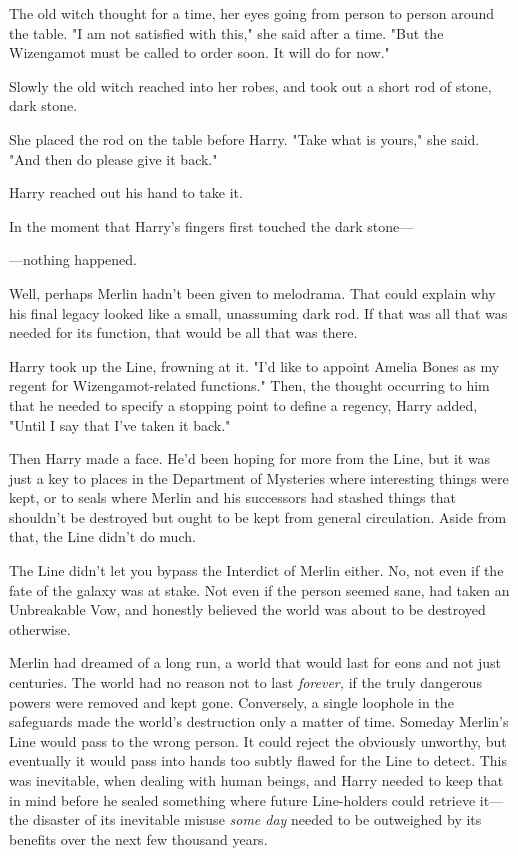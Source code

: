 The old witch thought for a time, her eyes going from person to person around
the table. "I am not satisfied with this," she said after a time. "But the
Wizengamot must be called to order soon. It will do for now."

Slowly the old witch reached into her robes, and took out a short rod of stone,
dark stone.

She placed the rod on the table before Harry. "Take what is yours," she said.
"And then do please give it back."

Harry reached out his hand to take it.

In the moment that Harry's fingers first touched the dark stone---

---nothing happened.

Well, perhaps Merlin hadn't been given to melodrama. That could explain why his
final legacy looked like a small, unassuming dark rod. If that was all that was
needed for its function, that would be all that was there.

Harry took up the Line, frowning at it. "I'd like to appoint Amelia Bones as my
regent for Wizengamot-related functions." Then, the thought occurring to him
that he needed to specify a stopping point to define a regency, Harry added,
"Until I say that I've taken it back."

Then Harry made a face. He'd been hoping for more from the Line, but it was
just a key to places in the Department of Mysteries where interesting things
were kept, or to seals where Merlin and his successors had stashed things that
shouldn't be destroyed but ought to be kept from general circulation. Aside
from that, the Line didn't do much.

The Line didn't let you bypass the Interdict of Merlin either. No, not even if
the fate of the galaxy was at stake. Not even if the person seemed sane, had
taken an Unbreakable Vow, and honestly believed the world was about to be
destroyed otherwise.

Merlin had dreamed of a long run, a world that would last for eons and not just
centuries. The world had no reason not to last \emph{forever,} if the truly
dangerous powers were removed and kept gone. Conversely, a single loophole in
the safeguards made the world's destruction only a matter of time. Someday
Merlin's Line would pass to the wrong person. It could reject the obviously
unworthy, but eventually it would pass into hands too subtly flawed for the
Line to detect. This was inevitable, when dealing with human beings, and Harry
needed to keep that in mind before he sealed something where future
Line-holders could retrieve it---the disaster of its inevitable misuse
\emph{some day} needed to be outweighed by its benefits over the next few
thousand years.

